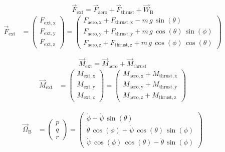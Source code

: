 \documentclass[lettersize,journal]{IEEEtran}
\begin{document}
{\begin{equation}
\overrightarrow{F}_{\mathrm{ext}}=\overrightarrow{F}_{\mathrm{aero}}+\overrightarrow{F}_{\mathrm{thrust}}+\overrightarrow{W}_{\mathrm{B}}
\end{equation}
\begin{equation}
\begin{aligned}
\overrightarrow{F}_{\mathrm{ext}}&=\left(\begin{array}{c} F_{\mathrm{ext,x}}\\ F_{\mathrm{ext,y}}\\ F_{\mathrm{ext,z}} \end{array}\right)=\left(\begin{array}{c} F_{\mathrm{aero,x}}+F_{\mathrm{thrust,x}}-m\,g\,\sin\left(\theta \right)\\ F_{\mathrm{aero,y}}+F_{\mathrm{thrust,y}}+m\,g\,\cos\left(\theta \right)\,\sin\left(\phi \right)\\ F_{\mathrm{aero,z}}+F_{\mathrm{thrust,z}}+m\,g\,\cos\left(\phi \right)\,\cos\left(\theta \right) \end{array}\right)
\end{aligned}
\end{equation}

\begin{equation}
\overrightarrow{M}_{\mathrm{ext}}=\overrightarrow{M}_{\mathrm{aero}}+\overrightarrow{M}_{\mathrm{thrust}}
\end{equation}
\begin{equation}
\begin{aligned}
\overrightarrow{M}_{\mathrm{ext}}&=\left(\begin{array}{c} M_{\mathrm{ext,x}}\\ M_{\mathrm{ext,y}}\\ M_{\mathrm{ext,z}} \end{array}\right)=\left(\begin{array}{c} M_{\mathrm{aero,x}}+M_{\mathrm{thrust,x}}\\ M_{\mathrm{aero,y}}+M_{\mathrm{thrust,y}}\\ M_{\mathrm{aero,z}}+M_{\mathrm{thrust,z}} \end{array}\right)
\end{aligned}
\end{equation}

\begin{equation}
\begin{aligned}
\overrightarrow{\Omega}_{\mathrm{B}}&=\left(\begin{array}{c} p\\ q\\ r \end{array}\right)=\left(\begin{array}{c} \dot{\phi }-\dot{\psi }\,\sin\left(\theta \right)\\ \dot{\theta }\,\cos\left(\phi \right)+\dot{\psi }\,\cos\left(\theta \right)\,\sin\left(\phi \right)\\ \dot{\psi }\,\cos\left(\phi \right)\,\cos\left(\theta \right)-\dot{\theta }\,\sin\left(\phi \right) \end{array}\right)
\end{aligned}
\end{equation}

}
\end{document}
